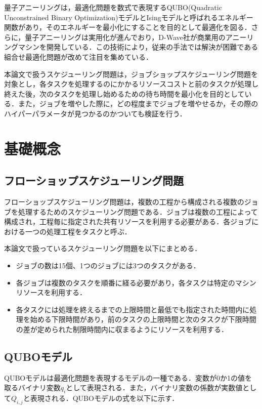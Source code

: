 \documentclass[conference]{IEEEtran}
\begin{document}
量子アニーリングは，最適化問題を数式で表現するQUBO(Quadratic Unconstrained Binary Optimization)モデルとIsingモデルと呼ばれるエネルギー関数があり，そのエネルギーを最小化にすることを目的として最適化を図る．さらに，量子アニーリングは実用化が進んでおり，D-Wave社が商業用のアニーリングマシンを開発している．この技術により，従来の手法では解決が困難である組合せ最適化問題が改めて注目を集めている．

本論文で扱うスケジューリング問題は，ジョブショップスケジューリング問題を対象とし，各タスクを処理するのにかかるリソースコストと前のタスクが処理し終えた後，次のタスクを処理し始めるための待ち時間を最小化を目的としている．また，ジョブを増やした際に，どの程度までジョブを増やせるか，その際のハイパーパラメータが見つかるのかついても検証を行う．

\section{基礎概念}
\subsection{フローショップスケジューリング問題}
フローショップスケジューリング問題は，複数の工程から構成される複数のジョブを処理するためのスケジューリング問題である．ジョブは複数の工程によって構成され，工程毎に指定された共有リソースを利用する必要がある．各ジョブにおける一つの処理工程をタスクと呼ぶ．\cite{b1}

本論文で扱っているスケジューリング問題を以下にまとめる．

\begin{itemize}
\item ジョブの数は15個、1つのジョブには3つのタスクがある．
\item 各ジョブは複数のタスクを順番に経る必要があり，各タスクは特定のマシンリソースを利用する．
\item 各タスクには処理を終えるまでの上限時間と最低でも指定された時間内に処理を始める下限時間があり，前のタスクの上限時間と次のタスクが下限時間の差が定められた制限時間内に収まるようにリソースを利用する．
\end{itemize}


\subsection{QUBOモデル}
QUBOモデルは最適化問題を表現するモデルの一種である．変数が0か1の値を取るバイナリ変数$q_i$として表現される．また，バイナリ変数の係数が実数値として$Q_{i,j}$と表現される．QUBOモデルの式を以下に示す．
\end{document}
